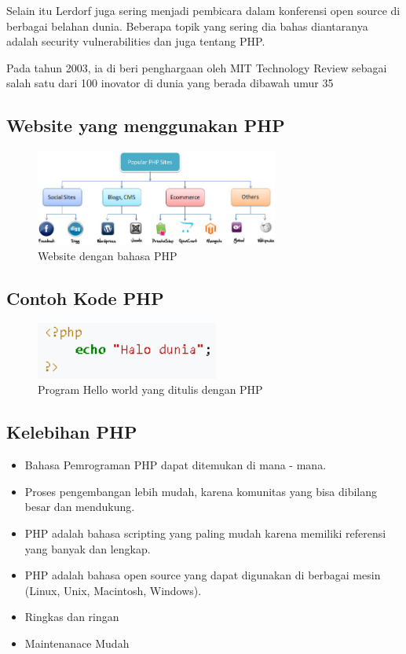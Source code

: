 \begin{enumerate}
Selain itu Lerdorf juga sering menjadi pembicara dalam konferensi open source di berbagai belahan dunia. Beberapa topik yang sering dia bahas diantaranya adalah security vulnerabilities dan juga tentang PHP.

Pada tahun 2003, ia di beri penghargaan oleh MIT Technology Review sebagai salah satu dari 100 inovator di dunia yang berada dibawah umur 35
\subsection{Website yang menggunakan PHP} 
	\begin{figure}[H]
		\includegraphics[width=8cm]{figures/web/popularphpsites.jpg}
		\centering
		\caption{Website dengan bahasa PHP}
	\end{figure}

\subsection{Contoh Kode PHP}
	\begin{figure}[H]
		\includegraphics[width=6cm]{figures/web/contohkodingphp.png}
		\centering
		\caption{Program Hello world yang ditulis dengan PHP}
	\end{figure}

\subsection{Kelebihan PHP}
\begin{itemize}
	\item Bahasa Pemrograman PHP dapat ditemukan di mana - mana.
	\item Proses pengembangan lebih mudah, karena komunitas yang bisa dibilang besar dan mendukung.
	\item PHP adalah bahasa scripting yang paling mudah karena memiliki referensi yang banyak dan lengkap.
	\item PHP adalah bahasa open source yang dapat digunakan di berbagai mesin (Linux, Unix, Macintosh, Windows).
	\item Ringkas dan ringan
	\item Maintenanace Mudah
\end{itemize}

\end{enumerate}

